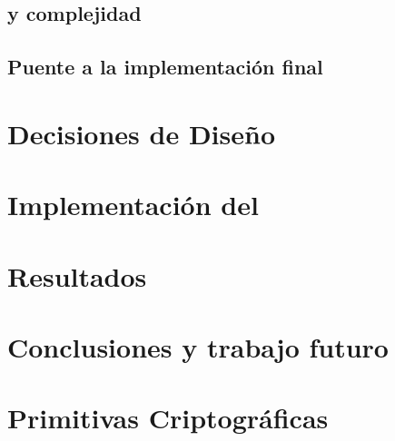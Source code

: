 \documentclass[11pt,a4paper,twoside]{tesis}
\begin{document}


\section{\HaloTwo y complejidad}
\label{sec:mithril-halotwo-y-complejidad}



\section{Puente a la implementación final}
\label{sec:mithril-puente-a-la-implementacion-final}



\chapter{Decisiones de Diseño}
\label{chap:decisiones-de-diseno}



\chapter{Implementación del \zkBridge}
\label{chap:implementacion-del-zkbridge}





\chapter{Resultados}
\label{chap:resultados}



\chapter{Conclusiones y trabajo futuro}
\label{chap:conclusiones-y-trabajo-futuro}



\backmatter




\cleardoublepage
\makeatletter
\@mainmattertrue
\makeatother
\appendix

\chapter{Primitivas Criptográficas}
\label{chap:primitivas-criptograficas}
\end{document}
